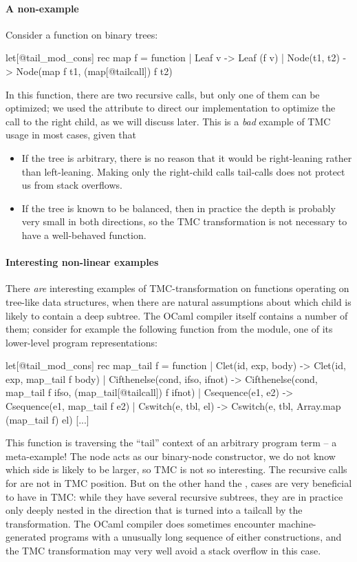 \paragraph{A non-example} Consider a  function on binary
trees:
\begin{Ocaml}
let[@tail_mod_cons] rec map f = function
| Leaf v -> Leaf (f v)
| Node(t1, t2) -> Node(map f t1, (map[@tailcall]) f t2)
\end{Ocaml}
In this function, there are two recursive calls, but only one of them
can be optimized; we used the \ocaml{[@tailcall]} attribute to direct
our implementation to optimize the call to the right child, as we will
discuss later. This is a \emph{bad} example of TMC usage in most
cases, given that
\begin{itemize}
\item If the tree is arbitrary, there is no reason that it would be
  right-leaning rather than left-leaning. Making only the right-child
  calls tail-calls does not protect us from stack overflows.
\item If the tree is known to be balanced, then in practice the depth
  is probably very small in both directions, so the TMC transformation
  is not necessary to have a well-behaved function.
\end{itemize}

\paragraph{Interesting non-linear examples} There \emph{are} interesting
examples of TMC-transformation on functions operating on tree-like
data structures, when there are natural assumptions about which child
is likely to contain a deep subtree. The OCaml compiler itself
contains a number of them; consider for example the following function
from the  module, one of its lower-level program
representations:

\begin{Ocaml}
let[@tail_mod_cons] rec map_tail f = function
  | Clet(id, exp, body) ->
      Clet(id, exp, map_tail f body)
  | Cifthenelse(cond, ifso, ifnot) ->
      Cifthenelse(cond, map_tail f ifso, (map_tail[@tailcall]) f ifnot)
  | Csequence(e1, e2) ->
      Csequence(e1, map_tail f e2)
  | Cswitch(e, tbl, el) ->
      Cswitch(e, tbl, Array.map (map_tail f) el)
  [...]
\end{Ocaml}

This function is traversing the ``tail'' context of an arbitrary
program term -- a meta-example! The  node acts as
our binary-node constructor, we do not know which side is likely to be
larger, so TMC is not so interesting. The recursive calls for
 are not in TMC position. But on the other hand the
,  cases are very beneficial to have in
TMC: while they have several recursive subtrees, they are in practice
only deeply nested in the direction that is turned into a tailcall by
the transformation. The OCaml compiler does sometimes encounter
machine-generated programs with a unusually long sequence of either
constructions, and the TMC transformation may very well avoid a stack
overflow in this case.

